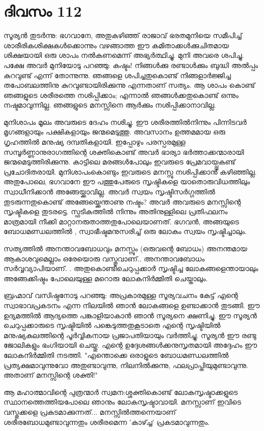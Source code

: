  
\section{ദിവസം 112}


സൂര്യന്‍ തുടര്‍ന്നു: ഭഗവാനേ, അതുകഴിഞ്ഞ്‌ രാജാവ്‌ ഭരതമുനിയെ സമീപിച്ച്‌ ശാരീരികശിക്ഷകള്‍ക്കൊന്നും വഴങ്ങാത്ത ഈ കമിതാക്കള്‍ക്കുചിതമായ ശിക്ഷയായി ഒരു ശാപം നല്‍കണമെന്ന് അഭ്യര്‍ത്ഥിച്ചു. മുനി അവരെ ശപിച്ചു. പക്ഷേ അവര്‍ മുനിയോടു പറഞ്ഞു: കഷ്ടം! നിങ്ങള്‍ക്കു രണ്ടാള്‍ക്കും ബുദ്ധി അല്‍പ്പം കുറവുണ്ട് എന്ന് തോന്നുന്നു. ഞങ്ങളെ ശപിച്ചതുകൊണ്ട്‌ നിങ്ങളാര്‍ജ്ജിച്ച തപോബലത്തിനു കുറവുണ്ടായിരിക്കുന്നു എന്നതാണ് സത്യം. ആ ശാപം കൊണ്ട്‌ ഞങ്ങളുടെ ശരീരത്തെ നശിപ്പിക്കാം; എന്നാല്‍ ഞങ്ങള്‍ക്കതുകൊണ്ട്‌ ഒന്നും നഷ്ടമാവുന്നില്ല. ഞങ്ങളുടെ മനസ്സിനെ ആര്‍ക്കും നശിപ്പിക്കാനാവില്ല.

മുനിശാപം മൂലം അവരുടെ ദേഹം നശിച്ചു. ഈ ശരീരത്തില്‍നിന്നും പിന്നിടവര്‍ മൃഗങ്ങളായും പക്ഷികളായും ജന്മമെടുത്തു. അവസാനം ഉത്തമമായ ഒരു ഗൃഹത്തില്‍ മനുഷ്യ ദമ്പതികളായി. ഇപ്പോഴും പരസ്പരമുള്ള സമ്പൂര്‍ണ്ണാനുരാഗത്തിന്റെ ശക്തികൊണ്ട്‌ അവര്‍ ഭാര്യാ ഭര്‍ത്താക്കന്മാരായി ജന്മമെടുത്തിരിക്കുന്നു. കാട്ടിലെ മരങ്ങള്‍പോലും ഇവരുടെ പ്രേമവായ്പ്പുകണ്ട്‌ പ്രചോദിതരായി. മുനിശാപംകൊണ്ടും ഇവരുടെ മനസ്സു നശിപ്പിക്കാന്‍ കഴിഞ്ഞില്ല. അതുപോലെ, ഭഗവാനേ ഈ പത്തുപേരുടെ സൃഷ്ടികളെ യാതൊരുവിധത്തിലും സ്വാധീനിക്കാന്‍ അങ്ങേയ്ക്കാവില്ല. അവര്‍ സ്വയം സൃഷ്ടിസര്‍ഗ്ഗത്തില്‍ തുടരുന്നതുകൊണ്ട്‌ അങ്ങേയ്ക്കെന്താണു നഷ്ടം? അവര്‍ അവരുടെ മനസ്സിന്റെ സൃഷ്ടികളെ തുടരട്ടെ. സ്ഫടികത്തില്‍ നിന്നും  അതിനുള്ളിലെ പ്രതിഫലനം മാത്രമായി നീക്കി മാറ്റാനരുതാത്തതുപോലെയാണത്‌. ഭഗവന്‍, അങ്ങയുടെ ബോധമണ്ഡലത്തില്‍ ,  സ്വാഭീഷ്ടമനുസരിച്ച്  ഒരു ലോകം സ്വയം സൃഷ്ടിച്ചാലും.

സത്യത്തില്‍ അനന്താവബോധവും മനസ്സും (ഒരുവന്റെ ബോധം) അനന്തമായ ആകാശവുമെല്ലാം ഒരേയൊരു വസ്തുവാണ്‌.. അനന്താവബോധം സര്‍വ്വവ്യാപിയാണ്‌. . അതുകൊണ്ടീചെറുപ്പക്കാര്‍ സൃഷ്ടിച്ച ലോകങ്ങളെന്തായാലും അങ്ങേക്കിഷ്ടം പോലെയുള്ള  മറൊരു ലോകനിര്‍മ്മിതി ചെയ്താലും.

ബ്രഹ്മാവ്‌ വസിഷ്ഠനോടു പറഞ്ഞു: അപ്രകാരമുള്ള സൂര്യവചനം കേട്ട്‌ എന്റെ സ്വാഭാവപ്രകടനം എന്ന നിലയില്‍ ഞാന്‍ ലോകങ്ങളെ ഉണ്ടാക്കാന്‍ തുടങ്ങി. ഈ ഉദ്യമത്തില്‍ ആദ്യത്തെ പങ്കാളിയാകാന്‍ ഞാന്‍ സൂര്യനെ ക്ഷണിച്ചു. ഈ സൂര്യന്‍ ചെറുപ്പക്കാരുടെ സൃഷ്ടിയില്‍ പങ്കെടുത്തതുകൂടാതെ എന്റെ സൃഷ്ടിയില്‍ മനുഷ്യകുലത്തിന്റെ പൂര്‍വ്വികനായ പ്രജാപതിയായും വര്‍ത്തിച്ചു. സൂര്യന്‍ ഈ രണ്ടു ജോലികളും ഭംഗിയായി ചെയ്തു. എന്റെ ഉദ്ദേശങ്ങള്‍ക്കനുസൃതമായി അദ്ദേഹം ഈ ലോകനിര്‍മ്മിതി നടത്തി. "എന്തൊക്കെ ഒരാളുടെ ബോധമണ്ഡലത്തില്‍ പ്രത്യക്ഷമാവുന്നുവോ അതുണ്ടാവുന്നു, നിലനില്‍ക്കുന്നു, ഫലപ്രാപ്തിയുമുണ്ടാവുന്നു. അതാണ്‌ മനസ്സിന്റെ ശക്തി!"

ആ മഹാത്മാവിന്റെ പുത്രന്മാര്‍ സ്വമന:ശ്ശക്തികൊണ്ട്‌ ലോകസൃഷ്ടാക്കളുടെ സ്ഥാനത്തെത്തിയപോലെ ഞാനും ലോകസൃഷ്ടാവായി. മനസ്സാണ്‌ ഇവിടെ വസ്തുക്കളെ പ്രകടമാക്കുന്നത്‌...  മനസ്സില്‍ത്തന്നെയാണ് ശരീരബോധമുണ്ടാവുന്നതും ശരീരമെന്ന 'കാഴ്ച്ച' പ്രകടമാവുന്നതും. 

